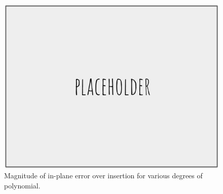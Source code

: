 \begin{figure}[h]
\includegraphics[width=1.0\textwidth]{Fig/placeholder.png}
\caption{Magnitude of in-plane error over insertion for various degrees of polynomial.}
\label{fig:results_error_comparison}
\end{figure}





